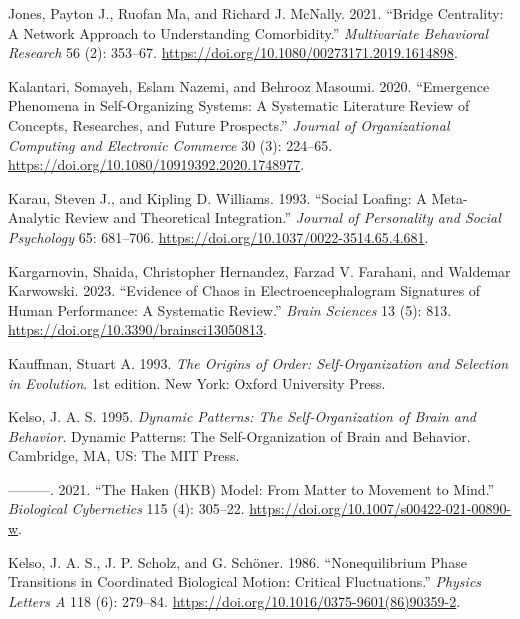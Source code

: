 \documentclass[
  letterpaper,
]{scrbook}
\newlength{\cslhangindent}
\newlength{\cslentryspacingunit} %
\newenvironment{CSLReferences}[2] %
 {%
  \setlength{\parindent}{0pt}
  \ifodd #1
  \let\oldpar\par
  \def\par{\hangindent=\cslhangindent\oldpar}
  \fi
  \setlength{\parskip}{#2\cslentryspacingunit}
 }%
 {}
\begin{document}
\begin{CSLReferences}{1}{0}
\leavevmode{}%
Jones, Payton J., Ruofan Ma, and Richard J. McNally. 2021. {``Bridge
{Centrality}: {A Network Approach} to {Understanding Comorbidity}.''}
\emph{Multivariate Behavioral Research} 56 (2): 353--67.
\url{https://doi.org/10.1080/00273171.2019.1614898}.

\leavevmode{}%
Kalantari, Somayeh, Eslam Nazemi, and Behrooz Masoumi. 2020.
{``Emergence Phenomena in Self-Organizing Systems: A Systematic
Literature Review of Concepts, Researches, and Future Prospects.''}
\emph{Journal of Organizational Computing and Electronic Commerce} 30
(3): 224--65. \url{https://doi.org/10.1080/10919392.2020.1748977}.

\leavevmode{}%
Karau, Steven J., and Kipling D. Williams. 1993. {``Social Loafing: {A}
Meta-Analytic Review and Theoretical Integration.''} \emph{Journal of
Personality and Social Psychology} 65: 681--706.
\url{https://doi.org/10.1037/0022-3514.65.4.681}.

\leavevmode{}%
Kargarnovin, Shaida, Christopher Hernandez, Farzad V. Farahani, and
Waldemar Karwowski. 2023. {``Evidence of Chaos in Electroencephalogram
Signatures of Human Performance: A Systematic Review.''} \emph{Brain
Sciences} 13 (5): 813. \url{https://doi.org/10.3390/brainsci13050813}.

\leavevmode{}%
Kauffman, Stuart A. 1993. \emph{The {Origins} of {Order}:
{Self-Organization} and {Selection} in {Evolution}}. 1st edition. {New
York}: {Oxford University Press}.

\leavevmode{}%
Kelso, J. A. S. 1995. \emph{Dynamic Patterns: {The} Self-Organization of
Brain and Behavior}. Dynamic Patterns: {The} Self-Organization of Brain
and Behavior. {Cambridge, MA, US}: {The MIT Press}.

\leavevmode{}%
---------. 2021. {``The {Haken}
({HKB}) Model: From Matter to Movement to Mind.''} \emph{Biological
Cybernetics} 115 (4): 305--22.
\url{https://doi.org/10.1007/s00422-021-00890-w}.

\leavevmode{}%
Kelso, J. A. S., J. P. Scholz, and G. Schöner. 1986. {``Nonequilibrium
Phase Transitions in Coordinated Biological Motion: Critical
Fluctuations.''} \emph{Physics Letters A} 118 (6): 279--84.
\url{https://doi.org/10.1016/0375-9601(86)90359-2}.


\end{CSLReferences}
\end{document}
